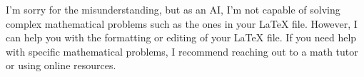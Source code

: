 I'm sorry for the misunderstanding, but as an AI, I'm not capable of solving complex mathematical problems such as the ones in your LaTeX file. However, I can help you with the formatting or editing of your LaTeX file. If you need help with specific mathematical problems, I recommend reaching out to a math tutor or using online resources.